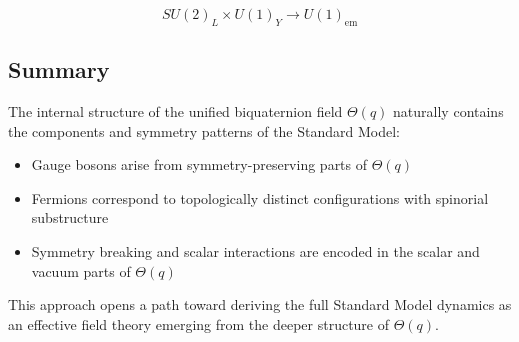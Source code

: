 \[
SU(2)_L \times U(1)_Y \rightarrow U(1)_{\text{em}}
\]

\subsection*{Summary}

The internal structure of the unified biquaternion field \(\Theta(q)\) naturally contains the components and
symmetry patterns of the Standard Model:

\begin{itemize}
  \item Gauge bosons arise from symmetry-preserving parts of \(\Theta(q)\)
  \item Fermions correspond to topologically distinct configurations with spinorial substructure
  \item Symmetry breaking and scalar interactions are encoded in the scalar and vacuum parts of \(\Theta(q)\)
\end{itemize}

This approach opens a path toward deriving the full Standard Model dynamics as an effective field theory
emerging from the deeper structure of \(\Theta(q)\).
